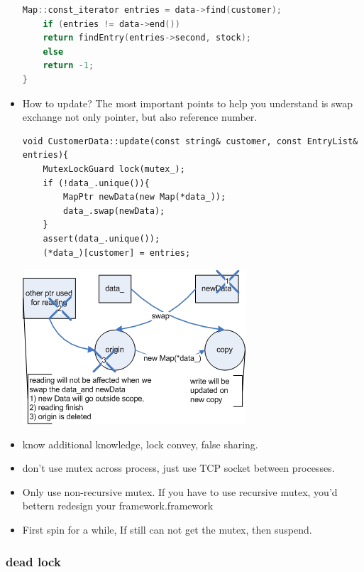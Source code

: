 \documentclass[a4paper,11pt,twoside]{book}
\begin{document}
\begin{itemize}
\begin{lstlisting}[frame=single, language=c++]
	Map::const_iterator entries = data->find(customer);
	if (entries != data->end())
	return findEntry(entries->second, stock);
	else
	return -1;
}
\end{lstlisting}

\item How to update? The most important points to help you understand is swap exchange not only pointer, but also reference number. 
\begin{lstlisting}
void CustomerData::update(const string& customer, const EntryList& entries){
    MutexLockGuard lock(mutex_);
	if (!data_.unique()){
	    MapPtr newData(new Map(*data_));
		data_.swap(newData);
    }
	assert(data_.unique());
	(*data_)[customer] = entries;
\end{lstlisting}

\begin{center}
		\includegraphics[width=0.65\linewidth]{pics/read_copy.png}
\end{center}

\item know additional knowledge, lock convey,  false sharing.

\item don't use mutex across process, just use TCP socket between processes. 

\item Only use non-recursive mutex. If you have to use recursive mutex, you'd bettern redesign your framework.framework

\item First spin for a while, If still can not get the mutex, then suspend.

\end{itemize}

\subsubsection{dead lock}
\end{document}
